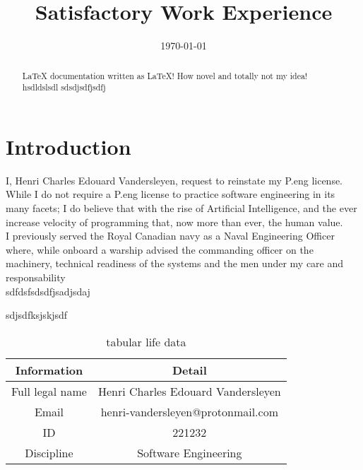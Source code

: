 \documentclass[12pt]{article}
\title{Satisfactory Work Experience}
\author{\fullname}
\date{\today}
\def\fullname{Henri Charles Edouard Vandersleyen}
\begin{document}
\maketitle

\newpage
\tableofcontents

\newpage
\section{Introduction}
I, \fullname, request to reinstate my P.eng license. While I do not require a
P.eng license to practice software engineering in its many facets; I do believe
that with the rise of Artificial Intelligence, and the ever increase velocity of
programming that, now more than ever, the human value. \\
I previously served the Royal Canadian navy as a Naval Engineering Officer
where, while onboard a warship advised the commanding officer on the machinery,
technical readiness of the systems and the men under my care and responsability  \\
sdfdsfsdsdfjsadjsdaj

sdjsdfksjskjsdf


\begin{abstract}
 \LaTeX{} documentation written as \LaTeX! How novel and totally not
 my idea!
 hsdldslsdl
 sdsdjsdfjsdfj
\end{abstract}
\begin{Applicant Information}
\begin{table}[H]
  \begin{tabular}{c|c}  %
    Information &  Detail \\ %
    \hline %
    Full legal name & \fullname  \\
    Email & henri-vandersleyen@protonmail.com \\
    ID & 221232 \\
    Discipline & Software Engineering
  \end{tabular}
  \caption{tabular life data}
\end{table}
\end{Applicant Information}
\end{document}
